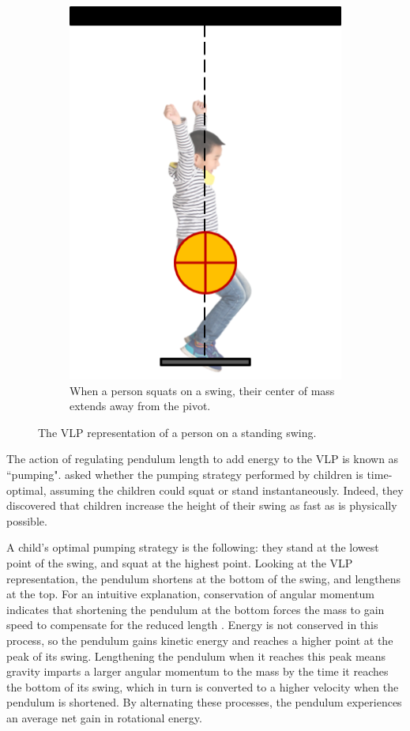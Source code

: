 \begin{figure}
\begin{subfigure}[t]{0.45\textwidth}
      \includegraphics[]{images/child_vlp_squatting.png}
      \caption{When a person squats on a swing, their center of mass extends
      away from the pivot.}
   \end{subfigure}
   \caption{The VLP representation of a person on a standing swing.}
   \label{fig:child-vlp}
\end{figure}

The action of regulating pendulum length to add energy to the VLP is known as
``pumping". \citet{pumping_swing_standing_squatting} asked whether
the pumping strategy performed by children is time-optimal, assuming the
children could squat or stand instantaneously. 
Indeed, they discovered that children increase the height of their swing as fast
as is physically possible.

A child's optimal pumping strategy is the following: 
they stand at the lowest point of the swing, and squat at the highest point.
Looking at the VLP representation, the pendulum shortens at the bottom of the
swing, and lengthens at the top. 
For an intuitive explanation, conservation of angular momentum indicates that
shortening the pendulum at the bottom forces the mass to gain speed to
compensate for the reduced length \cite{how_to_pump_a_swing}.
Energy is not conserved in this process, so the pendulum gains kinetic energy
and reaches a higher point at the peak of its swing.
Lengthening the pendulum when it reaches this peak means gravity
imparts a larger angular momentum to the mass by the time it reaches the bottom
of its swing, which in turn is converted to a higher velocity when the
pendulum is shortened.
By alternating these processes, the pendulum experiences an average net gain in
rotational energy.

